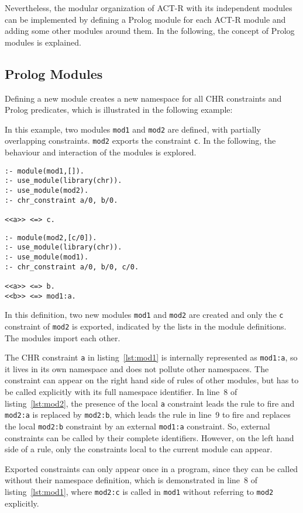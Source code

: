 Nevertheless, the modular organization of ACT-R with its independent modules can be implemented by defining a Prolog module for each ACT-R module and adding some other modules around them. In the following, the concept of Prolog modules is explained.

\subsection{Prolog Modules}

Defining a new module creates a new namespace for all CHR constraints and Prolog predicates, which is illustrated in the following example:

\begin{example}

In this example, two modules \lstinline|mod1| and \lstinline|mod2| are defined, with partially overlapping constraints. \lstinline|mod2| exports the constraint \lstinline|c|. In the following, the behaviour and interaction of the modules is explored.

\begin{lstlisting}[caption={Definition of Module 1},label=lst:mod1]
:- module(mod1,[]).
:- use_module(library(chr)).
:- use_module(mod2).
:- chr_constraint a/0, b/0.

<<a>> <=> c.
\end{lstlisting}

\begin{lstlisting}[caption={Definition of Module 2},label=lst:mod2]
:- module(mod2,[c/0]).
:- use_module(library(chr)).
:- use_module(mod1).
:- chr_constraint a/0, b/0, c/0. 

<<a>> <=> b.
<<b>> <=> mod1:a.
\end{lstlisting}


In this definition, two new modules \lstinline|mod1| and \lstinline|mod2| are created and only the \lstinline|c| constraint of \lstinline|mod2| is exported, indicated by the lists in the module definitions. The modules import each other.

The CHR constraint \lstinline|a| in listing~\ref{lst:mod1} is internally represented as \lstinline|mod1:a|, so it lives in its own namespace and does not pollute other namespaces. The constraint can appear on the right hand side of rules of other modules, but has to be called explicitly with its full namespace identifier. In line~8 of listing~\ref{lst:mod2}, the presence of the local \lstinline|a| constraint leads the rule to fire and \lstinline|mod2:a| is replaced by \lstinline|mod2:b|, which leads the rule in line~9 to fire and replaces the local \lstinline|mod2:b| constraint by an external \lstinline|mod1:a| constraint. So, external constraints can be called by their complete identifiers. However, on the left hand side of a rule, only the constraints local to the current module can appear. 

Exported constraints can only appear once in a program, since they can be called without their namespace definition, which is demonstrated in line~8 of listing~\ref{lst:mod1}, where \lstinline|mod2:c| is called in \lstinline|mod1| without referring to \lstinline|mod2| explicitly.
\end{example}

